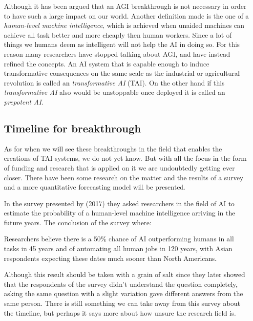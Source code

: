 \documentclass[12pt,A4]{report}
\theoremstyle{definition}
\begin{document}
Although it has been argued that an AGI breakthrough is not necessary in order to have such a large impact on our world. Another definition made is the one of a \textit{human-level machine intelligence}, which is achieved when unaided machines can achieve all task better and more cheaply then human workers. Since a lot of things we humans deem as intelligent will not help the AI in doing so. For this reason many researchers have stopped talking about AGI, and have instead refined the concepts. An AI system that is capable enough to induce transformative consequences on the same scale as the industrial or agricultural revolution is called an \textit{transformative AI} (TAI). On the other hand if this \textit{transformative AI} also would be unstoppable once deployed it is called an \textit{prepotent AI}. 


\subsection{Timeline for breakthrough}
As for when we will see these breakthroughs in the field that enables the creations of TAI systems, we do not yet know. But with all the focus in the form of funding and research that is applied on it we are undoubtedly getting ever closer. There have been some research on the matter and the results of a survey and a more quantitative forecasting model will be presented. %

In the survey presented by \autocite{Grace et al} (2017) they asked researchers in the field of AI to estimate the probability of a human-level machine intelligence arriving in the future years. The conclusion of the survey where:
\begin{displayquote}
Researchers believe there is a 50\% chance of AI outperforming humans in all tasks in 45 years and of automating all human jobs in 120 years, with Asian respondents expecting these dates much sooner than North Americans.
\end{displayquote}
Although this result should be taken with a grain of salt since they later showed that the respondents of the survey didn't understand the question completely, asking the same question with a slight variation gave different answers from the same person. There is still something we can take away from this survey about the timeline, but perhaps it says more about how unsure the research field is. 
\end{document}
